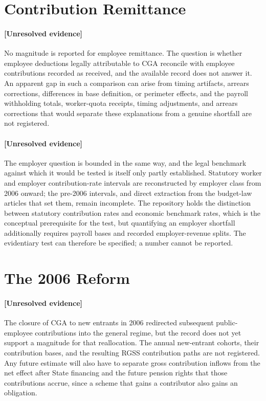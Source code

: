 \documentclass[11pt]{article}
\begin{document}
\section{Contribution Remittance}
\label{sec:remittance}
\paragraph{[Unresolved evidence]}
No magnitude is reported for employee remittance. The question is whether employee deductions legally attributable to CGA reconcile with employee contributions recorded as received, and the available record does not answer it. An apparent gap in such a comparison can arise from timing artifacts, arrears corrections, differences in base definition, or perimeter effects, and the payroll withholding totals, worker-quota receipts, timing adjustments, and arrears corrections that would separate these explanations from a genuine shortfall are not registered.

\paragraph{[Unresolved evidence]}
The employer question is bounded in the same way, and the legal benchmark against which it would be tested is itself only partly established. Statutory worker and employer contribution-rate intervals are reconstructed by employer class from 2006 onward; the pre-2006 intervals, and direct extraction from the budget-law articles that set them, remain incomplete. The repository holds the distinction between statutory contribution rates and economic benchmark rates, which is the conceptual prerequisite for the test, but quantifying an employer shortfall additionally requires payroll bases and recorded employer-revenue splits. The evidentiary test can therefore be specified; a number cannot be reported.

\section{The 2006 Reform}
\label{sec:reform2006}
\paragraph{[Unresolved evidence]}
The closure of CGA to new entrants in 2006 redirected subsequent public-employee contributions into the general regime, but the record does not yet support a magnitude for that reallocation. The annual new-entrant cohorts, their contribution bases, and the resulting RGSS contribution paths are not registered. Any future estimate will also have to separate gross contribution inflows from the net effect after State financing and the future pension rights that those contributions accrue, since a scheme that gains a contributor also gains an obligation.
\end{document}
